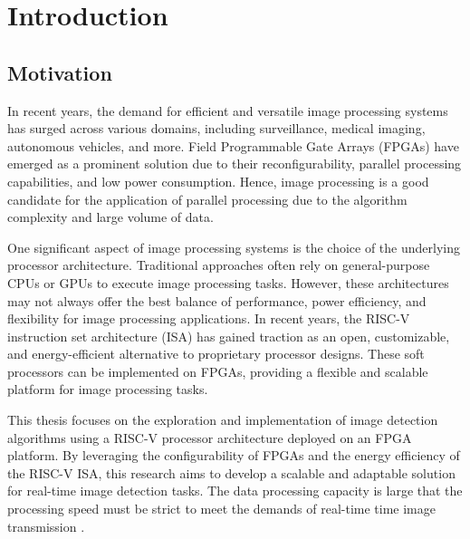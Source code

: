 \chapter[Introduction]{Introduction}
\label{Chap:Motivation}

\section{Motivation}

In recent years, the demand for efficient and versatile image processing systems has surged across various domains, including surveillance, medical imaging, autonomous vehicles, and more. 
Field Programmable Gate Arrays (FPGAs) have emerged as a prominent solution due to their reconfigurability, parallel processing capabilities, and low power consumption.
Hence, image processing is a good candidate for the application of parallel processing due to the algorithm complexity and large volume of data. \cite{Efficient}

One significant aspect of image processing systems is the choice of the underlying processor architecture. 
Traditional approaches often rely on general-purpose CPUs or GPUs to execute image processing tasks. 
However, these architectures may not always offer the best balance of performance, power efficiency, and flexibility for image processing applications. 
In recent years, the RISC-V instruction set architecture (ISA) has gained traction as an open, customizable, and energy-efficient alternative to proprietary processor designs.
These soft processors can be implemented on FPGAs, providing a flexible and scalable platform for image processing tasks.

This thesis focuses on the exploration and implementation of image detection algorithms using a RISC-V processor architecture deployed on an FPGA platform. 
By leveraging the configurability of FPGAs and the energy efficiency of the RISC-V ISA, this research aims to develop a scalable and adaptable solution for real-time image detection tasks.
The data processing capacity is large that the processing speed must be strict to meet the demands of real-time time image transmission \cite{Video}.